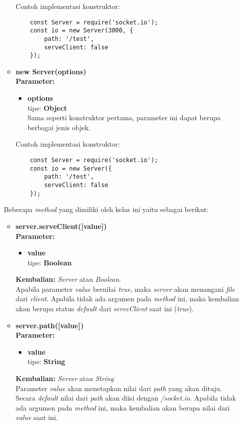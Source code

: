 \begin{enumerate}
\begin{itemize}
	Contoh implementasi konstruktor: 
	\begin{lstlisting}
	const Server = require('socket.io');
	const io = new Server(3000, {
		path: '/test',
		serveClient: false
	});
	\end{lstlisting}
	
	\item \textbf{new Server(options)} \\ 
	\textbf{Parameter:}
	
		\begin{itemize}
			\item \textbf{options} \\ tipe: \textbf{Object} \\ Sama seperti konstruktor pertama, parameter ini dapat berupa berbagai jenis objek.
		\end{itemize}
	
	Contoh implementasi konstruktor:
	
	\begin{lstlisting}
	const Server = require('socket.io');
	const io = new Server({
		path: '/test',
		serveClient: false
	});
	\end{lstlisting}
	
	\end{itemize}

	Beberapa \textit{method} yang dimiliki oleh kelas ini yaitu sebagai berikut: 
	
		\begin{itemize}
			\item \textbf{server.serveClient([value])} \\ 
			\textbf{Parameter:}
			\begin{itemize}
				\item \textbf{value} \\ tipe: \textbf{Boolean}
			\end{itemize}
			\textbf{Kembalian:} \textit{Server} atau \textit{Boolean}. \\
			Apabila parameter \textit{value} bernilai \textit{true}, maka \textit{server} akan menangani \textit{file} dari \textit{client}. Apabila tidak ada argumen pada \textit{method} ini, maka kembalian akan berupa status \textit{default} dari \textit{serveClient} saat ini (\textit{true}).
			
			\item \textbf{server.path([value])} \\
			\textbf{Parameter:}
			\begin{itemize}
				\item \textbf{value} \\ tipe: \textbf{String}
			\end{itemize}
			\textbf{Kembalian:} \textit{Server} atau \textit{String} \\
			Parameter \textit{value} akan menetapkan nilai dari \textit{path} yang akan dituju. Secara \textit{default} nilai dari \textit{path} akan diisi dengan \textit{/socket.io}. Apabila tidak ada argumen pada \textit{method} ini, maka kembalian akan berupa nilai dari \textit{value} saat ini.
			

\end{itemize}
\end{enumerate}
